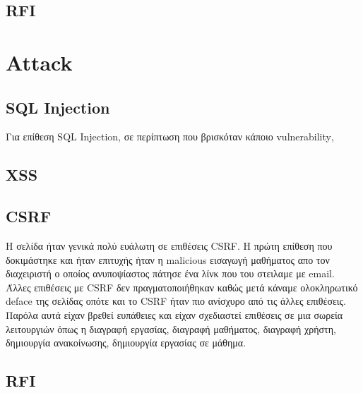 \documentclass{article}
\begin{document}
\subsection*{\textlatin{RFI}}









\section*{\textlatin{Attack}}








\subsection*{\textlatin{SQL Injection}}
Για επίθεση \textlatin{SQL Injection}, σε περίπτωση που βρισκόταν κάποιο \textlatin{vulnerability},





\subsection*{\textlatin{XSS}}

\subsection*{\textlatin{CSRF}}
Η σελίδα ήταν γενικά πολύ ευάλωτη σε επιθέσεις \textlatin{CSRF}. Η πρώτη
επίθεση που δοκιμάστηκε και ήταν επιτυχής ήταν η \textlatin{malicious} εισαγωγή
μαθήματος απο τον διαχειριστή ο οποίος ανυποψίαστος πάτησε ένα λίνκ που του στειλαμε με
\textlatin{email}. Άλλες επιθέσεις με \textlatin{CSRF} δεν πραγματοποιήθηκαν καθώς μετά
κάναμε ολοκληρωτικό \textlatin{deface} της σελίδας οπότε και το \textlatin{CSRF} ήταν πιο
ανίσχυρο από τις άλλες επιθέσεις. Παρόλα αυτά είχαν βρεθεί ευπάθειες και είχαν σχεδιαστεί
επιθέσεις σε μια σωρεία λειτουργιών όπως η διαγραφή εργασίας, διαγραφή μαθήματος, διαγραφή
χρήστη, δημιουργία ανακοίνωσης, δημιουργία εργασίας σε μάθημα.



\subsection*{\textlatin{RFI}}
\end{document}
